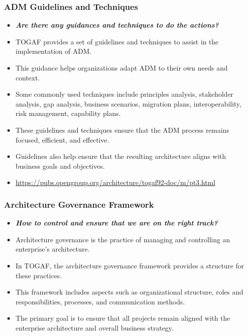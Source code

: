 \documentclass[aspectratio=169, table]{beamer}
\begin{document}
	\begin{frame}
		\frametitle{ADM Guidelines and Techniques}
		\vspace{15pt}
		\begin{itemize}
			\item \textbf{\textit{Are there any guidances and techniques to do the actions?}}
			\item TOGAF provides a set of guidelines and techniques to assist in the implementation of ADM.
			\item This guidance helps organizations adapt ADM to their own needs and context.
			\item Some commonly used techniques include principles analysis, stakeholder analysis, gap analysis, business scenarios, migration plans, interoperability, risk management, capability plans.
			\item These guidelines and techniques ensure that the ADM process remains focused, efficient, and effective.
			\item Guidelines also help ensure that the resulting architecture aligns with business goals and objectives.
			\item \url{https://pubs.opengroup.org/architecture/togaf92-doc/m/pt3.html}
		\end{itemize}
	\end{frame}
	
	\begin{frame}
		\frametitle{Architecture Governance Framework}
		\begin{itemize}
			\item \textbf{\textit{How to control and ensure that we are on the right track?}}
			\item Architecture governance is the practice of managing and controlling an enterprise's architecture.
			\item In TOGAF, the architecture governance framework provides a structure for these practices.
			\item This framework includes aspects such as organizational structure, roles and responsibilities, processes, and communication methods.
			\item The primary goal is to ensure that all projects remain aligned with the enterprise architecture and overall business strategy.
		\end{itemize}
	\end{frame}
	
\end{document}
